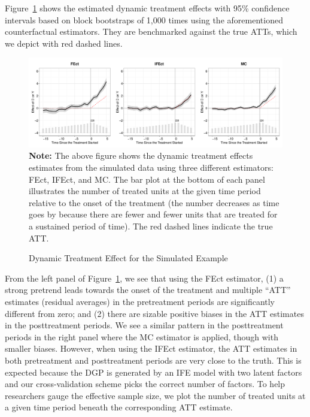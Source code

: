 \documentclass[12pt]{article}
\begin{document}
Figure~\ref{fg:gap} shows the estimated dynamic treatment effects with 95\% confidence intervals based on block bootstraps of 1,000 times using the aforementioned counterfactual estimators. They are benchmarked against the true ATTs, which we depict with red dashed lines. 
\begin{figure}[!ht]
\caption{Dynamic Treatment Effect for the Simulated Example}\label{fg:gap}
\centering
\begin{minipage}{1\linewidth}{\centering
\includegraphics[width = 1\textwidth]{sim0_gap.pdf}\\}
 \footnotesize\textbf{Note:} The above figure shows the dynamic treatment effects estimates from the simulated data using three different estimators: FEct, IFEct, and MC. The bar plot at the bottom of each panel illustrates the number of treated units at the given time period relative to the onset of the treatment (the number decreases as time goes by because there are fewer and fewer units that are treated for a sustained period of time). The red dashed lines indicate the true ATT.  
\end{minipage}
\end{figure}
From the left panel of Figure~\ref{fg:gap}, we see that using the FEct estimator, (1) a strong pretrend leads towards the onset of the treatment and multiple ``ATT''  estimates (residual averages) in the pretreatment periods are significantly different from zero; and (2) there are sizable positive biases in the ATT estimates in the posttreatment periods. We see a similar pattern in the posttreatment periods in the right panel where the MC estimator is applied, though with smaller biases. However, when using the IFEct estimator, the ATT estimates in both pretreatment and posttreatment periods are very close to the truth. This is expected because the DGP is generated by an IFE model with two latent factors and our cross-validation scheme picks the correct number of factors. To help researchers gauge the effective sample size, we plot the number of treated units at a given time period beneath the corresponding ATT estimate.
\end{document}
